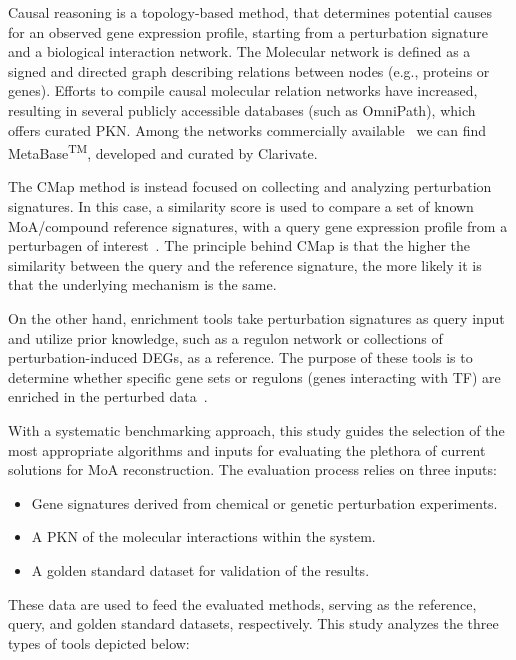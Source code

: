 Causal reasoning is a topology-based method, that determines potential causes for an observed gene expression profile, starting from a perturbation signature and a biological interaction network. 
The \gls{Molecular network} is defined as a signed and directed graph describing relations between nodes (e.g., proteins or genes). 
Efforts to compile causal molecular relation networks have increased, resulting in several publicly accessible databases (such as OmniPath), which offers curated \gls{PKN}. 
Among the networks commercially available~\cite{RN32} we can find MetaBase\textsuperscript{TM}, developed and curated by Clarivate.

The \gls{CMap} method is instead focused on collecting and analyzing perturbation signatures. 
In this case, a similarity score is used to compare a set of known \gls{MoA}/compound reference signatures, with a query gene expression profile from a perturbagen of interest~\cite{RN34, RN31}.
The principle behind \gls{CMap} is that the higher the similarity between the query and the reference signature, the more likely it is that the underlying mechanism is the same. 

On the other hand, enrichment tools take perturbation signatures as query input and utilize prior knowledge, such as a regulon network or collections of perturbation-induced \gls{DEGs}, as a reference. 
The purpose of these tools is to determine whether specific gene sets or regulons (genes interacting with \gls{TF}) are enriched in the perturbed data~\cite{RN35}.

With a systematic benchmarking approach, this study guides the selection of the most appropriate algorithms and inputs for evaluating the plethora of current solutions for \gls{MoA} reconstruction.
The evaluation process relies on three inputs:

\begin{itemize}
  \item \gls{Gene signature}s derived from chemical or genetic perturbation experiments.
  \item A \gls{PKN} of the molecular interactions within the system. 
  \item A golden standard dataset for validation of the results.
\end{itemize}

These data are used to feed the evaluated methods, serving as the reference, query, and golden standard datasets, respectively. 
This study analyzes the three types of tools depicted below: 

